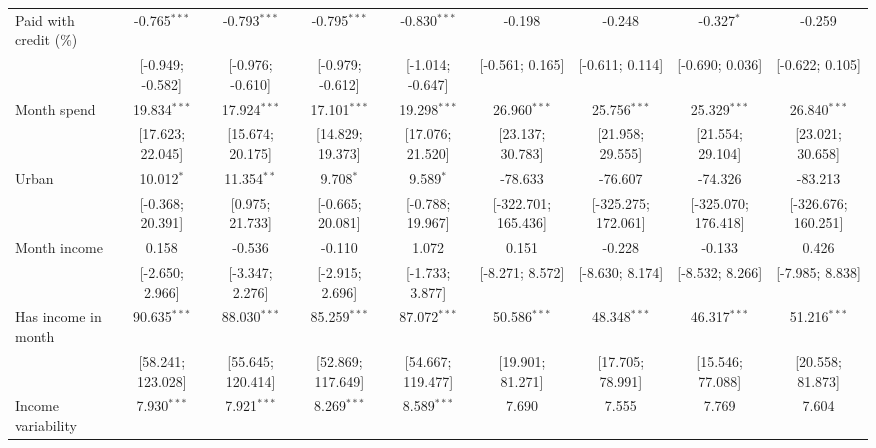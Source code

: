 \begin{table}[htbp]
\begin{threeparttable}[b]
\begin{tabular}{lcccccccc}
         Paid with credit (\%)  & -0.765$^{***}$    & -0.793$^{***}$     & -0.795$^{***}$     & -0.830$^{***}$    & -0.198              & -0.248              & -0.327$^{*}$        & -0.259\\   
                                & [-0.949; -0.582]  & [-0.976; -0.610]   & [-0.979; -0.612]   & [-1.014; -0.647]  & [-0.561; 0.165]     & [-0.611; 0.114]     & [-0.690; 0.036]     & [-0.622; 0.105]\\   
         Month spend            & 19.834$^{***}$    & 17.924$^{***}$     & 17.101$^{***}$     & 19.298$^{***}$    & 26.960$^{***}$      & 25.756$^{***}$      & 25.329$^{***}$      & 26.840$^{***}$\\   
                                & [17.623; 22.045]  & [15.674; 20.175]   & [14.829; 19.373]   & [17.076; 21.520]  & [23.137; 30.783]    & [21.958; 29.555]    & [21.554; 29.104]    & [23.021; 30.658]\\   
         Urban                  & 10.012$^{*}$      & 11.354$^{**}$      & 9.708$^{*}$        & 9.589$^{*}$       & -78.633             & -76.607             & -74.326             & -83.213\\   
                                & [-0.368; 20.391]  & [0.975; 21.733]    & [-0.665; 20.081]   & [-0.788; 19.967]  & [-322.701; 165.436] & [-325.275; 172.061] & [-325.070; 176.418] & [-326.676; 160.251]\\   
         Month income           & 0.158             & -0.536             & -0.110             & 1.072             & 0.151               & -0.228              & -0.133              & 0.426\\   
                                & [-2.650; 2.966]   & [-3.347; 2.276]    & [-2.915; 2.696]    & [-1.733; 3.877]   & [-8.271; 8.572]     & [-8.630; 8.174]     & [-8.532; 8.266]     & [-7.985; 8.838]\\   
         Has income in month    & 90.635$^{***}$    & 88.030$^{***}$     & 85.259$^{***}$     & 87.072$^{***}$    & 50.586$^{***}$      & 48.348$^{***}$      & 46.317$^{***}$      & 51.216$^{***}$\\   
                                & [58.241; 123.028] & [55.645; 120.414]  & [52.869; 117.649]  & [54.667; 119.477] & [19.901; 81.271]    & [17.705; 78.991]    & [15.546; 77.088]    & [20.558; 81.873]\\   
         Income variability     & 7.930$^{***}$     & 7.921$^{***}$      & 8.269$^{***}$      & 8.589$^{***}$     & 7.690               & 7.555               & 7.769               & 7.604\\   

\end{tabular}
\end{threeparttable}
\end{table}
